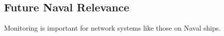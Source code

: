 \subsection{Future Naval Relevance}

Monitoring is important for network systems like those on Naval ships.